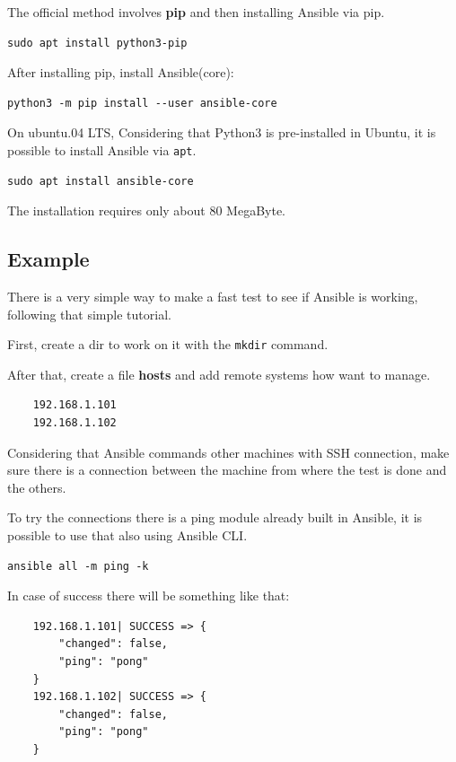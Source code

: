 \documentclass[12pt,a4paper,openright,twoside]{book}
\begin{document}
The official method involves \textbf{pip} and then installing Ansible via pip.
\begin{lstlisting}
sudo apt install python3-pip
\end{lstlisting}

After installing pip, install Ansible(core):

\begin{lstlisting}
python3 -m pip install --user ansible-core
\end{lstlisting}

On ubuntu.04 LTS,
Considering that Python3 is pre-installed in Ubuntu, it is possible to install Ansible via \texttt{apt}.

\begin{lstlisting}
sudo apt install ansible-core
\end{lstlisting}

The installation requires only about 80 MegaByte.

\subsection{Example}

There is a very simple way to make a fast test to see if Ansible is working, following that simple tutorial\cite{ansibleRIP}.


First, create a dir to work on it with the \texttt{mkdir} command.


After that, create a file \textbf{hosts} and add remote systems how want to manage.
\begin{lstlisting}
    192.168.1.101
    192.168.1.102
\end{lstlisting}

Considering that Ansible commands other machines with SSH connection, make sure there is a connection between the machine from where the test is done and the others.

To try the connections there is a ping module already built in Ansible, it is possible to use that also using Ansible CLI.
\begin{lstlisting}
ansible all -m ping -k
\end{lstlisting}

In case of success there will be something like that:
\begin{lstlisting}
    192.168.1.101| SUCCESS => {
        "changed": false, 
        "ping": "pong"
    }
    192.168.1.102| SUCCESS => {
        "changed": false, 
        "ping": "pong"
    }
\end{lstlisting}
\end{document}

